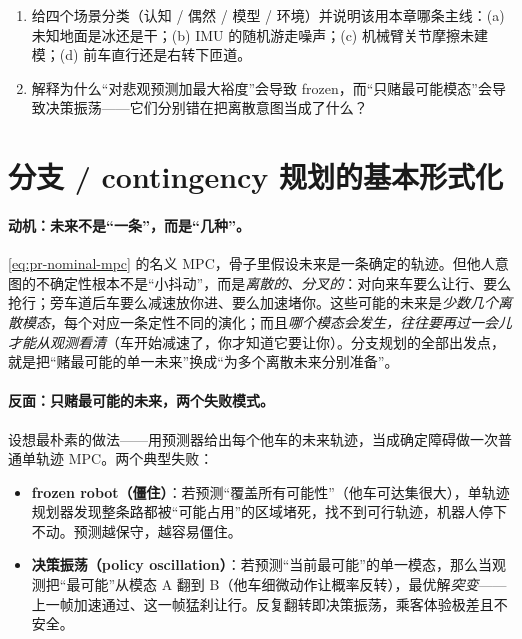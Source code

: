 \begin{practice}
\begin{enumerate}
  \item 给四个场景分类（认知 / 偶然 / 模型 / 环境）并说明该用本章哪条主线：(a) 未知地面是冰还是干；(b) IMU 的随机游走噪声；(c) 机械臂关节摩擦未建模；(d) 前车直行还是右转下匝道。
  \item 解释为什么“对悲观预测加最大裕度”会导致 frozen，而“只赌最可能模态”会导致决策振荡——它们分别错在把离散意图当成了什么？
\end{enumerate}
\end{practice}

\section{分支 / contingency 规划的基本形式化}
\label{sec:pr-branch-form}

\paragraph{动机：未来不是“一条”，而是“几种”。}
\cref{eq:pr-nominal-mpc} 的名义 MPC，骨子里假设未来是一条确定的轨迹。但他人意图的不确定性根本不是“小抖动”，而是\emph{离散的、分叉的}：对向来车要么让行、要么抢行；旁车道后车要么减速放你进、要么加速堵你。这些可能的未来是\emph{少数几个离散模态}，每个对应一条定性不同的演化；而且\emph{哪个模态会发生，往往要再过一会儿才能从观测看清}（车开始减速了，你才知道它要让你）。分支规划的全部出发点，就是把“赌最可能的单一未来”换成“为多个离散未来分别准备”。

\paragraph{反面：只赌最可能的未来，两个失败模式。}
设想最朴素的做法——用预测器给出每个他车的未来轨迹，当成确定障碍做一次普通单轨迹 MPC。两个典型失败：
\begin{itemize}
  \item \textbf{frozen robot（僵住）}：若预测“覆盖所有可能性”（他车可达集很大），单轨迹规划器发现整条路都被“可能占用”的区域堵死，找不到可行轨迹，机器人停下不动。预测越保守，越容易僵住。
  \item \textbf{决策振荡（policy oscillation）}：若预测“当前最可能”的单一模态，那么当观测把“最可能”从模态 A 翻到 B（他车细微动作让概率反转），最优解\emph{突变}——上一帧加速通过、这一帧猛刹让行。反复翻转即决策振荡，乘客体验极差且不安全。
\end{itemize}

